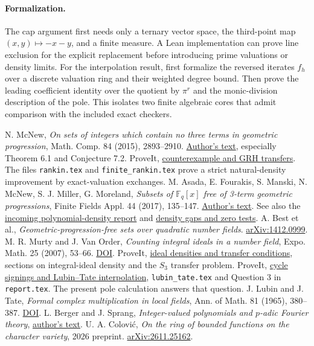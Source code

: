 \documentclass[11pt]{article}
\newcommand{\incoming}[2]{\href{https://github.com/VladimirReshetnikov/ProveIt/blob/1677488425e45c3df14149c804014133798136a5/docs/incoming/#1}{#2}}
\begin{document}
\paragraph{Formalization.}
The cap argument first needs only a ternary vector space, the third-point map $(x,y)\mapsto-x-y$, and a finite measure. A Lean implementation can prove line exclusion for the explicit replacement before introducing prime valuations or density limits. For the interpolation result, first formalize the reversed iterates $f_h$ over a discrete valuation ring and their weighted degree bound. Then prove the leading coefficient identity over the quotient by $\pi^r$ and the monic-division description of the pole. This isolates two finite algebraic cores that admit comparison with the included exact checkers.
\begin{thebibliography}{99}
 N. McNew, \emph{On sets of integers which contain no three terms in geometric progression}, Math. Comp. 84 (2015), 2893--2910. \href{https://www.nathanmcnew.com/GPFsets.pdf}{Author's text}, especially Theorem 6.1 and Conjecture 7.2.
 ProveIt, \incoming{mcnew_counterexample_and_grh_transfers.zip}{counterexample and GRH transfers}. The files \texttt{rankin.tex} and \texttt{finite\_rankin.tex} prove a strict natural-density improvement by exact-valuation exchanges.
 M. Asada, E. Fourakis, S. Manski, N. McNew, S. J. Miller, G. Moreland, \emph{Subsets of $\mathbb F_q[x]$ free of 3-term geometric progressions}, Finite Fields Appl. 44 (2017), 135--147. \href{https://www.nathanmcnew.com/fqxramsey.pdf}{Author's text}. See also the \incoming{grh-progression-densities-and-cubic-prime-race.zip}{incoming polynomial-density report} and \incoming{grh_transfers_density_gaps_and_zero_tests.zip}{density gaps and zero tests}.
 A. Best et al., \emph{Geometric-progression-free sets over quadratic number fields}. \href{https://arxiv.org/abs/1412.0999}{arXiv:1412.0999}.
 M. R. Murty and J. Van Order, \emph{Counting integral ideals in a number field}, Expo. Math. 25 (2007), 53--66. \href{https://doi.org/10.1016/j.exmath.2006.08.001}{DOI}.
 ProveIt, \incoming{grh_ideal_densities_and_transfer_conditions_2026-11-26.zip}{ideal densities and transfer conditions}, sections on integral-ideal density and the $S_3$ transfer problem.
 ProveIt, \incoming{grh_transfers_cycle_signings_and_lubin_tate.zip}{cycle signings and Lubin--Tate interpolation}, \texttt{lubin\_tate.tex} and Question 3 in \texttt{report.tex}. The present pole calculation answers that question.
 J. Lubin and J. Tate, \emph{Formal complex multiplication in local fields}, Ann. of Math. 81 (1965), 380--387. \href{https://doi.org/10.2307/1970622}{DOI}.
 L. Berger and J. Sprang, \emph{Integer-valued polynomials and $p$-adic Fourier theory}, \href{https://perso.ens-lyon.fr/laurent.berger/articles/POLINT.pdf}{author's text}.
 U. A. Colovi\'c, \emph{On the ring of bounded functions on the character variety}, 2026 preprint. \href{https://arxiv.org/abs/2611.25162}{arXiv:2611.25162}.
\end{thebibliography}
\end{document}
